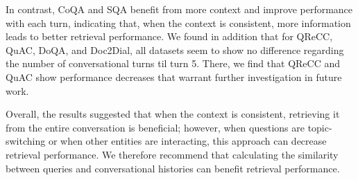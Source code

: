 \documentclass[11pt]{article}
\begin{document}
In contrast, CoQA and SQA benefit from more context and improve performance with each turn, indicating that, when the context is consistent, more information leads to better retrieval performance. We found in addition that for QReCC, QuAC, DoQA, and Doc2Dial, all datasets seem to show no difference regarding the number of conversational turns til turn 5. There, we find that QReCC and QuAC show performance decreases that warrant further investigation in future work.

Overall, the results suggested that when the context is consistent, retrieving it from the entire conversation is beneficial; however, when questions are topic-switching or when other entities are interacting, this approach can decrease retrieval performance. We therefore recommend that calculating the similarity between queries and conversational histories can benefit retrieval performance.






\end{document}
